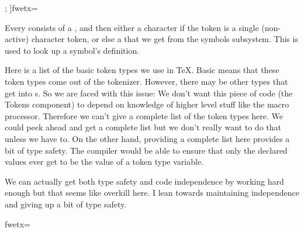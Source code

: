 \fwbeginmacro
{}\fwplusequals \fwodef \fwbtx[int Global::BoxReg[256];
]fwetx=%
\fwcdef 
\fwbeginmacronotes
{}
\fwendmacronotes
\fwendmacro








Every  consists of a , and then either a
character if the token is a single (non-active) character token, or
else a  that we get from the symbols subsystem. This is used
to look up a symbol's definition.

Here is a list of the basic token types we use in \TeX. Basic means
that these token types come out of the tokenizer. However, there may
be other types that get into s. So we are faced with this
issue: We don't want this piece of code (the Tokens component) to
depend on knowledge of higher level stuff like the macro
processor. Therefore we can't give a complete list of the token types
here. We could peek ahead and get a complete list but we don't really
want to do that unless we have to. On the other hand, providing a
complete list here provides a bit of type safety. The compiler would
be able to ensure that only the declared values ever get to be the
value of a token type variable.

We can actually get both type safety and code independence by working
hard enough but that seems like overkill here. I lean towards maintaining
independence and giving up a bit of type safety.

\fwbeginmacro
{}\fwplusequals \fwodef {}fwetx=%
\fwcdef 
\fwbeginmacronotes
{}
\fwendmacronotes
\fwendmacro




